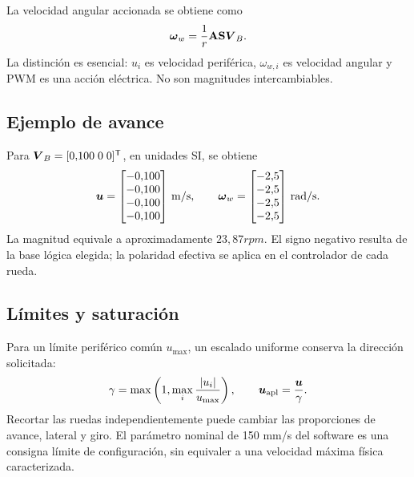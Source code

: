 La velocidad angular accionada se obtiene como
\begin{equation}
\boldsymbol{\omega}_w=\frac{1}{r}\mathbf{A}\mathbf{S}\boldsymbol{V}_B.
\end{equation}
La distinción es esencial: $u_i$ es velocidad periférica, $\omega_{w,i}$ es velocidad angular y PWM es una acción eléctrica. No son magnitudes intercambiables.

\subsection{Ejemplo de avance}
Para $\boldsymbol{V}_B=[0{,}100\;0\;0]^{\mathsf{T}}$, en unidades SI, se obtiene
\begin{equation}
\boldsymbol{u}=\begin{bmatrix}-0{,}100\\-0{,}100\\-0{,}100\\-0{,}100\end{bmatrix}\,\mathrm{m/s},
\qquad
\boldsymbol{\omega}_w=\begin{bmatrix}-2{,}5\\-2{,}5\\-2{,}5\\-2{,}5\end{bmatrix}\,\mathrm{rad/s}.
\end{equation}
La magnitud equivale a aproximadamente $23{,}87\unit{rpm}$. El signo negativo resulta de la base lógica elegida; la polaridad efectiva se aplica en el controlador de cada rueda.

\subsection{Límites y saturación}
Para un límite periférico común $u_{\max}$, un escalado uniforme conserva la dirección solicitada:
\begin{equation}
\gamma=\max\left(1,\max_i\frac{|u_i|}{u_{\max}}\right),
\qquad \boldsymbol{u}_{\mathrm{apl}}=\frac{\boldsymbol{u}}{\gamma}.
\end{equation}
Recortar las ruedas independientemente puede cambiar las proporciones de avance, lateral y giro. El parámetro nominal de 150 mm/s del software es una consigna límite de configuración, sin equivaler a una velocidad máxima física caracterizada.

